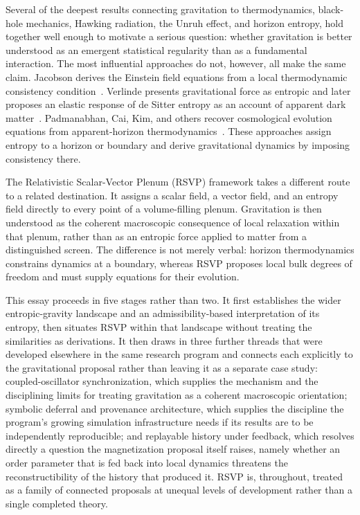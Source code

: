 \documentclass[11pt]{article}
\begin{document}
Several of the deepest results connecting gravitation to thermodynamics, black-hole mechanics, Hawking radiation, the Unruh effect, and horizon entropy, hold together well enough to motivate a serious question: whether gravitation is better understood as an emergent statistical regularity than as a fundamental interaction. The most influential approaches do not, however, all make the same claim. Jacobson derives the Einstein field equations from a local thermodynamic consistency condition~\cite{jacobson1995}. Verlinde presents gravitational force as entropic and later proposes an elastic response of de Sitter entropy as an account of apparent dark matter~\cite{verlinde2011,verlinde2016}. Padmanabhan, Cai, Kim, and others recover cosmological evolution equations from apparent-horizon thermodynamics~\cite{padmanabhan2010,caikim2005}. These approaches assign entropy to a horizon or boundary and derive gravitational dynamics by imposing consistency there.

The Relativistic Scalar-Vector Plenum (RSVP) framework takes a different route to a related destination. It assigns a scalar field, a vector field, and an entropy field directly to every point of a volume-filling plenum. Gravitation is then understood as the coherent macroscopic consequence of local relaxation within that plenum, rather than as an entropic force applied to matter from a distinguished screen. The difference is not merely verbal: horizon thermodynamics constrains dynamics at a boundary, whereas RSVP proposes local bulk degrees of freedom and must supply equations for their evolution.

This essay proceeds in five stages rather than two. It first establishes the wider entropic-gravity landscape and an admissibility-based interpretation of its entropy, then situates RSVP within that landscape without treating the similarities as derivations. It then draws in three further threads that were developed elsewhere in the same research program and connects each explicitly to the gravitational proposal rather than leaving it as a separate case study: coupled-oscillator synchronization, which supplies the mechanism and the disciplining limits for treating gravitation as a coherent macroscopic orientation; symbolic deferral and provenance architecture, which supplies the discipline the program's growing simulation infrastructure needs if its results are to be independently reproducible; and replayable history under feedback, which resolves directly a question the magnetization proposal itself raises, namely whether an order parameter that is fed back into local dynamics threatens the reconstructibility of the history that produced it. RSVP is, throughout, treated as a family of connected proposals at unequal levels of development rather than a single completed theory.
\end{document}
